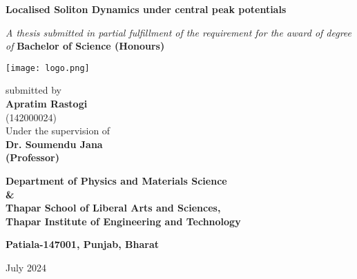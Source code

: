 \begin{titlepage}\singlespacing
    \begin{center}
            
        \Huge
        \textbf{Localised Soliton Dynamics under central peak potentials}
            
         \vspace{0.5cm}
         \Large
            

            
        {\small \sl A thesis submitted in partial fulfillment of the requirement for the award of degree of }
        {\large\bf Bachelor of Science (Honours)}
            
        \vspace{0.8cm}
         
        \texttt{[image: logo.png]}

            
        {\normalsize submitted by}\\
        {\bf Apratim Rastogi}\\
        {\normalsize (142000024)}\\
        {\normalsize Under the supervision of}\\
        {\bf Dr. Soumendu Jana}\\
        {\normalsize \bf (Professor)}

        \large
        {\bf \large Department of Physics and Materials Science}\\
        {\bf \&} \\
        {\bf \large Thapar School of Liberal Arts and Sciences,}\\

        \vspace*{10pt}
        {\bf \large Thapar Institute of Engineering and Technology}

        {\bf \small Patiala-147001, Punjab, Bharat}


        {\normalsize July 2024}
            
       
            
    \end{center}
\end{titlepage}